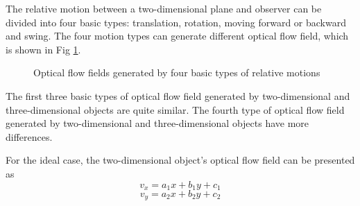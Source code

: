 \documentclass[journal]{IEEEtran}
\begin{document}
The relative motion between a two-dimensional plane and observer can be divided into four basic types: translation, rotation, moving forward or backward and swing. The four motion types can generate different optical flow field, which is shown in Fig \ref{fig_C_1}.

\begin{figure}[!t]
\centering
{}
\caption{Optical flow fields generated by four basic types of relative motions}
\label{fig_C_1}
\end{figure}

The first three basic types of optical flow field generated by two-dimensional and three-dimensional objects are quite similar. The fourth type of optical flow field generated by two-dimensional and three-dimensional objects have more differences.

For the ideal case, the two-dimensional object's optical flow field can be presented as
\begin{equation}
\label{eq_C_1}
v_x = a_1x + b_1y + c_1
\end{equation}
\begin{equation}
\label{eq_C_2}
v_y = a_2x + b_2y + c_2
\end{equation}
\end{document}
